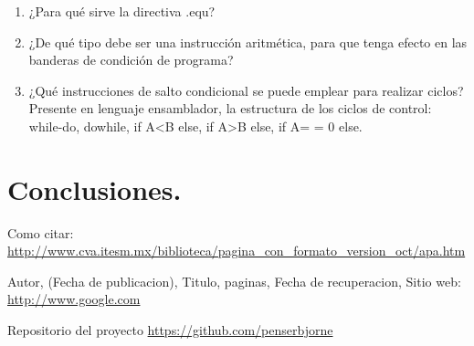 \documentclass[a4paper,11pt]{article}                 %
\begin{document}
  \begin{enumerate}
  	\item ¿Para qué sirve la directiva .equ?
  	\item ¿De qué tipo debe ser una instrucción aritmética, para que tenga efecto en las banderas de condición de programa?
  	\item ¿Qué instrucciones de salto condicional se puede emplear para realizar ciclos?  Presente en lenguaje ensamblador, la estructura de los ciclos de control: while-do, dowhile, if A<B else, if A>B else, if A= = 0 else. 
  \end{enumerate}

\section{Conclusiones.}
  \begin{thebibliography}{}                           %
      Como citar: \url{http://www.cva.itesm.mx/biblioteca/pagina_con_formato_version_oct/apa.htm} %

      Autor,
      (Fecha de publicacion),
      Titulo, paginas,
      Fecha de recuperacion,
      Sitio web: \url{http://www.google.com}

      Repositorio del proyecto \url{https://github.com/penserbjorne}
  \end{thebibliography}

\end{document}
